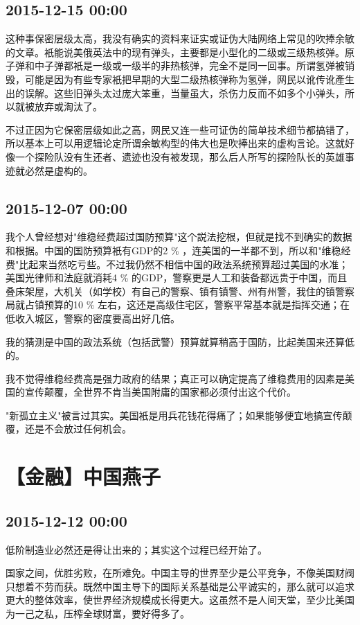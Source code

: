 \documentclass[twocolumn]{ctexart}
\begin{document}
\subsection*{2015-12-15 00:00}
这种事保密层级太高，我没有确实的资料来证实或证伪大陆网络上常见的吹捧余敏的文章。衹能说美俄英法中的现有弹头，主要都是小型化的二级或三级热核弹。原子弹和中子弹都衹是一级或一级半的非热核弹，完全不是同一回事。所谓氢弹被销毁，可能是因为有些专家衹把早期的大型二级热核弹称为氢弹，网民以讹传讹產生出的误解。这些旧弹头太过庞大笨重，当量虽大，杀伤力反而不如多个小弹头，所以就被放弃或淘汰了。

不过正因为它保密层级如此之高，网民又连一些可证伪的简单技术细节都搞错了，所以基本上可以用逻辑论定所谓余敏构型的伟大也是吹捧出来的虚构言论。这就好像一个探险队没有生还者、遗迹也没有被发现，那么后人所写的探险队长的英雄事迹就必然是虚构的。\subsection*{2015-12-07 00:00}
我个人曾经想对"维稳经费超过国防预算"这个説法挖根，但就是找不到确实的数据和根据。中国的国防预算衹有GDP的2 \% ，连美国的一半都不到，所以和"维稳经费"比起来当然吃亏些。不过我仍然不相信中国的政法系统预算超过美国的水准；美国光律师和法庭就消耗4 \% 的GDP，警察更是人工和装备都远贵于中国，而且叠床架屋，大机关（如学校）有自己的警察、镇有镇警、州有州警，我住的镇警察局就占镇预算的10 \% 左右，这还是高级住宅区，警察平常基本就是指挥交通；在低收入城区，警察的密度要高出好几倍。

我的猜测是中国的政法系统（包括武警）预算就算稍高于国防，比起美国来还算低的。

我不觉得维稳经费高是强力政府的结果；真正可以确定提高了维稳费用的因素是美国的宣传颠覆，全世界不肯当美国附庸的国家都必须付出这个代价。

"新孤立主义"被言过其实。美国衹是用兵花钱花得痛了；如果能够便宜地搞宣传颠覆，还是不会放过任何机会。\section*{【金融】中国燕子}
\subsection*{2015-12-12 00:00}
低阶制造业必然还是得让出来的；其实这个过程已经开始了。

国家之间，优胜劣败，在所难免。中国主导的世界至少是公平竞争，不像美国财阀只想着不劳而获。既然中国主导下的国际关系基础是公平诚实的，那么就可以追求更大的整体效率，使世界经济规模成长得更大。这虽然不是人间天堂，至少比美国为一己之私，压榨全球财富，要好得多了。
\end{document}
